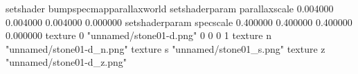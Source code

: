 setshader bumpspecmapparallaxworld
setshaderparam parallaxscale 0.004000 0.004000 0.004000 0.000000
setshaderparam specscale 0.400000 0.400000 0.400000 0.000000
texture 0 "unnamed/stone01-d.png" 0 0 0 1
texture n "unnamed/stone01-d_n.png"
texture s "unnamed/stone01_s.png"
texture z "unnamed/stone01-d_z.png"